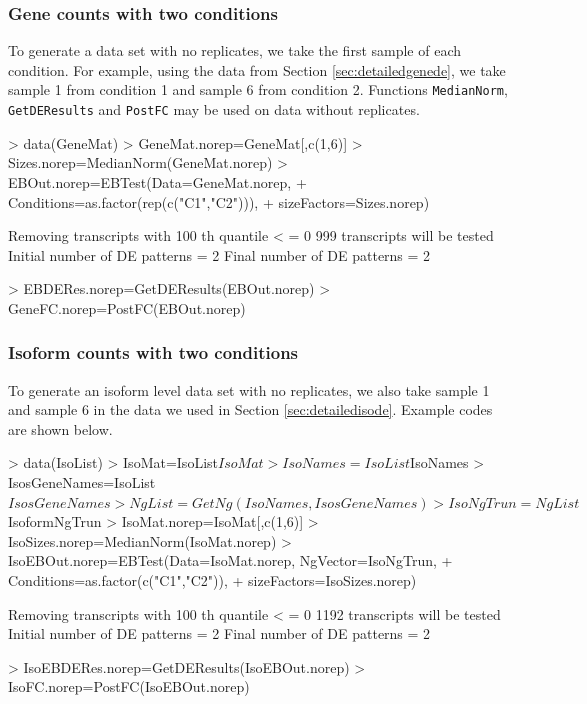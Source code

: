 \documentclass{article}
\begin{document}
\subsubsection{Gene counts with two conditions}
\label{sec:norepgenede}

To generate a data set with no replicates, we take the first sample of each condition. 
For example, using the data from Section \ref{sec:detailedgenede}, we take sample 1 from condition 1 and 
sample 6 from condition 2. Functions \verb+MedianNorm+, \verb+GetDEResults+ and 
\verb+PostFC+ may be used on data without replicates.
\begin{Schunk}
\begin{Sinput}
> data(GeneMat)
> GeneMat.norep=GeneMat[,c(1,6)]
> Sizes.norep=MedianNorm(GeneMat.norep)
> EBOut.norep=EBTest(Data=GeneMat.norep,
+ Conditions=as.factor(rep(c("C1","C2"))),
+ sizeFactors=Sizes.norep)
\end{Sinput}
\begin{Soutput}
Removing transcripts with 100 th quantile < = 0 
999 transcripts will be tested
Initial number of DE patterns = 2
Final number of DE patterns = 2
\end{Soutput}
\begin{Sinput}
> EBDERes.norep=GetDEResults(EBOut.norep)
> GeneFC.norep=PostFC(EBOut.norep)
\end{Sinput}
\end{Schunk}

\subsubsection{Isoform counts with two conditions}
\label{norepisode}
To generate an isoform level data set with no replicates, we
also take sample 1 and sample 6 in the data we used in Section
\ref{sec:detailedisode}. 
Example codes are shown below.

\begin{Schunk}
\begin{Sinput}
> data(IsoList)
> IsoMat=IsoList$IsoMat
> IsoNames=IsoList$IsoNames
> IsosGeneNames=IsoList$IsosGeneNames
> NgList=GetNg(IsoNames, IsosGeneNames)
> IsoNgTrun=NgList$IsoformNgTrun
> IsoMat.norep=IsoMat[,c(1,6)]
> IsoSizes.norep=MedianNorm(IsoMat.norep)
> IsoEBOut.norep=EBTest(Data=IsoMat.norep, NgVector=IsoNgTrun,
+ Conditions=as.factor(c("C1","C2")),
+ sizeFactors=IsoSizes.norep)
\end{Sinput}
\begin{Soutput}
Removing transcripts with 100 th quantile < = 0 
1192 transcripts will be tested
Initial number of DE patterns = 2
Final number of DE patterns = 2
\end{Soutput}
\begin{Sinput}
> IsoEBDERes.norep=GetDEResults(IsoEBOut.norep)
> IsoFC.norep=PostFC(IsoEBOut.norep)
\end{Sinput}
\end{Schunk}
\end{document}
